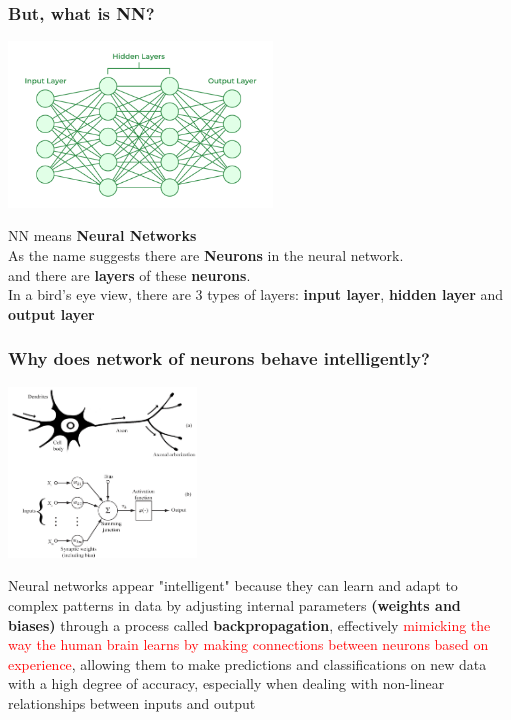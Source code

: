 \documentclass{beamer}
\begin{document}
\begin{frame}
    \frametitle{But, what is NN?}

    \begin{center}
        \includegraphics[width=7cm]{Neural-Networks-Architecture.png}
    \end{center}
    
    NN means \textbf{Neural Networks}
    \\
    As the name suggests there are \textbf{Neurons} in the neural network.
    \\
    and there are \textbf{layers} of these \textbf{neurons}.
    \\
    In a bird's eye view, there are 3 types of layers: \textbf{input layer}, \textbf{hidden layer} and \textbf{output layer}
\end{frame}

\begin{frame}
    \frametitle{Why does network of neurons behave intelligently?}
    \begin{center}
        \includegraphics[width=5cm]{neural-netork-weights-biases.png}
    \end{center}
    Neural networks appear "intelligent" because they can learn and adapt to complex patterns in data by adjusting internal parameters \textbf{(weights and biases)} through a process called \textbf{backpropagation}, effectively \textcolor{red}{mimicking the way the human brain learns by making connections between neurons based on experience}, allowing them to make predictions and classifications on new data with a high degree of accuracy, especially when dealing with non-linear relationships between inputs and output
\end{frame}
\end{document}
